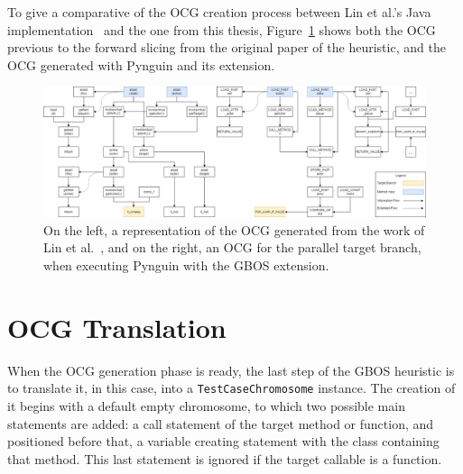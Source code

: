 \documentclass[%
  chapterprefix=false,%
  open=right,%
  twoside=true,%
  paper=a4,%
  logofile={Figures/logo.png},%
  thesistype=master,%
  UKenglish,%
]{se2thesis}
\newcommand{\classname}[1]{\texttt{#1}}
\begin{document}
To give a comparative of the OCG creation process between Lin et al.'s Java implementation~\cite{DBLP:conf/sigsoft/0001O00D21} and the one from this thesis, Figure~\ref{fig:ocgs} shows both the OCG previous to the forward slicing from the original paper of the heuristic, and the OCG generated with Pynguin and its extension.

\begin{figure}
  \includegraphics[width=\textwidth]{Figures/ocg_graphs.png}
  \caption{On the left, a representation of the OCG generated from the work of Lin et al.~\cite{DBLP:conf/sigsoft/0001O00D21}, and on the right, an OCG for the parallel target branch, when executing Pynguin with the GBOS extension.}\label{fig:ocgs}
\end{figure}

\section{OCG Translation}

When the OCG generation phase is ready, the last step of the GBOS heuristic is to translate it, in this case, into a \classname{TestCaseChromosome} instance.
The creation of it begins with a default empty chromosome, to which two possible main statements are added: a call statement of the target method or function, and positioned before that, a variable creating statement with the class containing that method.
This last statement is ignored if the target callable is a function.
\end{document}
